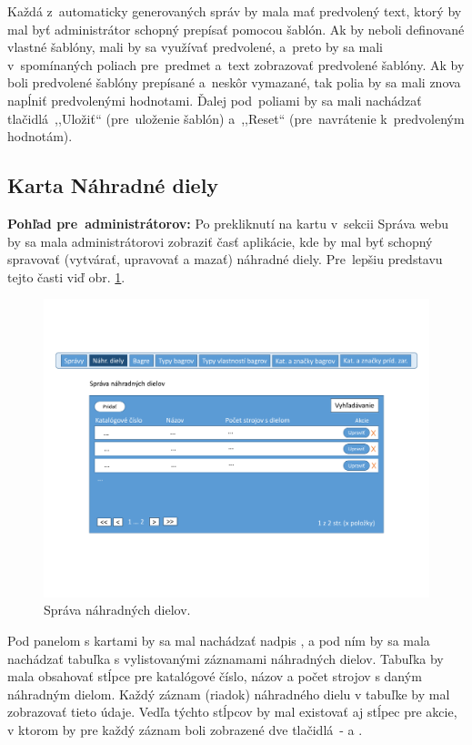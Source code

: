 Každá z~automaticky generovaných správ by mala mať predvolený text, ktorý by mal byť administrátor schopný prepísať pomocou šablón. Ak by neboli definované vlastné šablóny, mali by sa využívať predvolené, a~preto by sa mali v~spomínaných poliach pre~predmet a~text zobrazovať predvolené šablóny. Ak by boli predvolené šablóny prepísané a~neskôr vymazané, tak polia by sa mali znova napĺniť predvolenými hodnotami. Ďalej pod~poliami by sa mali nachádzať tlačidlá~,,Uložiť`` (pre~uloženie šablón) a~,,Reset`` (pre~navrátenie k~predvoleným hodnotám).
\newpage
\subsection{Karta Náhradné diely}
\label{karta nahradne diely}

\textbf{Pohľad pre~administrátorov:} Po prekliknutí na kartu  v~sekcii Správa webu by sa mala administrátorovi zobraziť časť aplikácie, kde by mal byť schopný spravovať (vytvárať, upravovať a mazať) náhradné diely. Pre~lepšiu predstavu tejto časti viď obr. \ref{spare parts management}.

\begin{figure}[H]\centering
\includegraphics[width=140mm]{../img/UI concept/spare parts management}
\caption{Správa náhradných dielov.}
\label{spare parts management}
\end{figure}

Pod panelom s kartami by sa mal nachádzať nadpis , a pod ním by sa mala nachádzať tabuľka s vylistovanými záznamami náhradných dielov. Tabuľka by mala obsahovať stĺpce pre katalógové číslo, názov a počet strojov s daným náhradným dielom. Každý záznam (riadok) náhradného dielu v tabuľke by mal zobrazovať tieto údaje. Vedľa týchto stĺpcov by mal existovať aj stĺpec pre akcie, v ktorom by pre každý záznam boli zobrazené dve tlačidlá~-  a .

